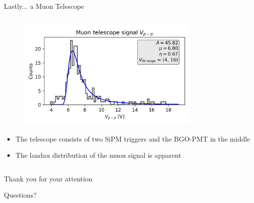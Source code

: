 \begin{columnframe}{Lastly... a Muon Telescope}
\begin{column}{0.5\textwidth}
\begin{figure}
            \includegraphics[width=0.8\textwidth, frame]{images/landau_fit.jpg}
        \end{figure}
        \begin{itemize}
            \item The telescope consists of two SiPM triggers and the BGO-PMT in the middle
            \item The landau distribution of the muon signal is apparent
        \end{itemize}
    \end{column}
\end{columnframe}


\begin{frame}[plain]
    \centering
    \Large{Thank you for your attention}
    \vspace{0.5cm}

    \small{Questions?}
\end{frame}

\appendix

